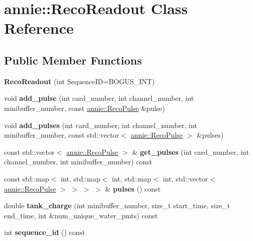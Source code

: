 \hypertarget{classannie_1_1RecoReadout}{
\section{annie::RecoReadout Class Reference}
\label{classannie_1_1RecoReadout}
}
\subsection*{Public Member Functions}
\begin{DoxyCompactItemize}
\item 
\hypertarget{classannie_1_1RecoReadout_a895b169058fbedb1a33c17101b299426}{
{\bfseries RecoReadout} (int SequenceID=BOGUS\_\-INT)}
\label{classannie_1_1RecoReadout_a895b169058fbedb1a33c17101b299426}

\item 
\hypertarget{classannie_1_1RecoReadout_aeeeb5f5b5fe7cce67513f69a0a98eedc}{
void {\bfseries add\_\-pulse} (int card\_\-number, int channel\_\-number, int minibuffer\_\-number, const \hyperlink{classannie_1_1RecoPulse}{annie::RecoPulse} \&pulse)}
\label{classannie_1_1RecoReadout_aeeeb5f5b5fe7cce67513f69a0a98eedc}

\item 
\hypertarget{classannie_1_1RecoReadout_ab9d0fa2b7d46c297b275bddda316cb48}{
void {\bfseries add\_\-pulses} (int card\_\-number, int channel\_\-number, int minibuffer\_\-number, const std::vector$<$ \hyperlink{classannie_1_1RecoPulse}{annie::RecoPulse} $>$ \&pulses)}
\label{classannie_1_1RecoReadout_ab9d0fa2b7d46c297b275bddda316cb48}

\item 
\hypertarget{classannie_1_1RecoReadout_a641407363a62f44da1264a533bb9b033}{
const std::vector$<$ \hyperlink{classannie_1_1RecoPulse}{annie::RecoPulse} $>$ \& {\bfseries get\_\-pulses} (int card\_\-number, int channel\_\-number, int minibuffer\_\-number) const }
\label{classannie_1_1RecoReadout_a641407363a62f44da1264a533bb9b033}

\item 
\hypertarget{classannie_1_1RecoReadout_a8459748f093e5ab9545fcdd8283e6edc}{
const std::map$<$ int, std::map$<$ int, std::map$<$ int, std::vector$<$ \hyperlink{classannie_1_1RecoPulse}{annie::RecoPulse} $>$ $>$ $>$ $>$ \& {\bfseries pulses} () const }
\label{classannie_1_1RecoReadout_a8459748f093e5ab9545fcdd8283e6edc}

\item 
\hypertarget{classannie_1_1RecoReadout_af85424158b1d9452793e041f95c9ad60}{
double {\bfseries tank\_\-charge} (int minibuffer\_\-number, size\_\-t start\_\-time, size\_\-t end\_\-time, int \&num\_\-unique\_\-water\_\-pmts) const }
\label{classannie_1_1RecoReadout_af85424158b1d9452793e041f95c9ad60}

\item 
\hypertarget{classannie_1_1RecoReadout_a52ec4886c6477e18fd8b177fe6db3cc7}{
int {\bfseries sequence\_\-id} () const }
\label{classannie_1_1RecoReadout_a52ec4886c6477e18fd8b177fe6db3cc7}

\end{DoxyCompactItemize}
